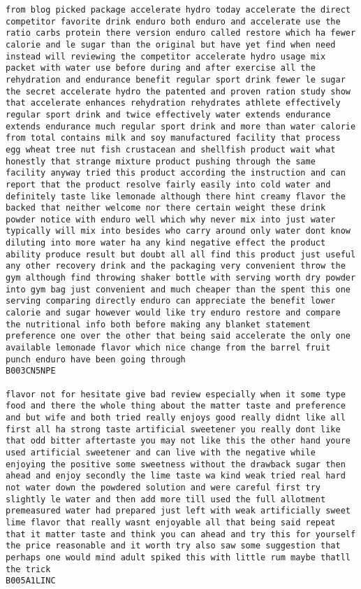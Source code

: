 \documentclass[11pt]{article}
\begin{document}
\begin{Verbatim}[commandchars=\\\{\}]
from blog picked package accelerate hydro today accelerate the direct competitor favorite drink enduro both enduro and accelerate use the ratio carbs protein there version enduro called restore which ha fewer calorie and le sugar than the original but have yet find when need instead will reviewing the competitor accelerate hydro usage mix packet with water use before during and after exercise all the rehydration and endurance benefit regular sport drink fewer le sugar the secret accelerate hydro the patented and proven ration study show that accelerate enhances rehydration rehydrates athlete effectively regular sport drink and twice effectively water extends endurance extends endurance much regular sport drink and more than water calorie from total contains milk and soy manufactured facility that process egg wheat tree nut fish crustacean and shellfish product wait what honestly that strange mixture product pushing through the same facility anyway tried this product according the instruction and can report that the product resolve fairly easily into cold water and definitely taste like lemonade although there hint creamy flavor the backed that neither welcome nor there certain weight these drink powder notice with enduro well which why never mix into just water typically will mix into besides who carry around only water dont know diluting into more water ha any kind negative effect the product ability produce result but doubt all all find this product just useful any other recovery drink and the packaging very convenient throw the gym although find throwing shaker bottle with serving worth dry powder into gym bag just convenient and much cheaper than the spent this one serving comparing directly enduro can appreciate the benefit lower calorie and sugar however would like try enduro restore and compare the nutritional info both before making any blanket statement preference one over the other that being said accelerate the only one available lemonade flavor which nice change from the barrel fruit punch enduro have been going through
B003CN5NPE

flavor not for hesitate give bad review especially when it some type food and there the whole thing about the matter taste and preference and but wife and both tried really enjoys good really didnt like all first all ha strong taste artificial sweetener you really dont like that odd bitter aftertaste you may not like this the other hand youre used artificial sweetener and can live with the negative while enjoying the positive some sweetness without the drawback sugar then ahead and enjoy secondly the lime taste wa kind weak tried real hard not water down the powdered solution and were careful first try slightly le water and then add more till used the full allotment premeasured water had prepared just left with weak artificially sweet lime flavor that really wasnt enjoyable all that being said repeat that it matter taste and think you can ahead and try this for yourself the price reasonable and it worth try also saw some suggestion that perhaps one would mind adult spiked this with little rum maybe thatll the trick
B005A1LINC


    \end{Verbatim}
\end{document}

